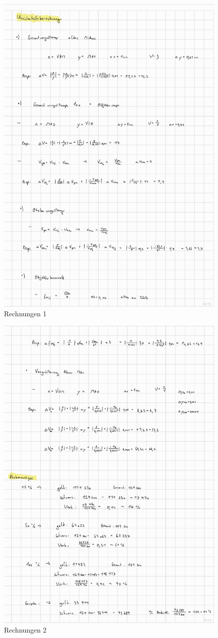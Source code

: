 \documentclass[12pt,a4paper,twoside]{article}
\begin{document}
\begin{figure}[H]
    \centering
    \includegraphics[width=0.9\linewidth, angle=0]{nudes/Rechnungen1.jpg}
    \caption{Rechnungen 1}
    \label{fig:Rechnungen1}
\end{figure}

\begin{figure}[H]
    \centering
    \includegraphics[width=0.9\linewidth, angle=0]{nudes/Rechnungen2.jpg}
    \caption{Rechnungen 2}
    \label{fig:Rechnungen2}
\end{figure}
\end{document}
